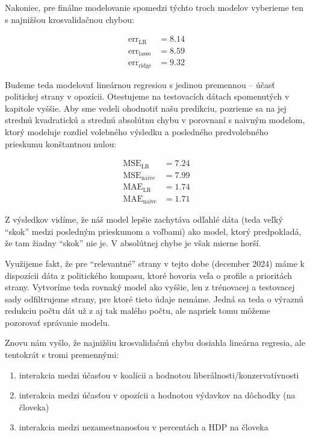 \documentclass[report.tex]{subfiles}
\begin{document}
Nakoniec, pre finálne modelovanie spomedzi týchto troch modelov vyberieme ten s najnižšou krosvalidačnou chybou:

\begin{align*}
	\operatorname{err}_{\operatorname{LR}} &= 8.14 \\
	\operatorname{err}_{\operatorname{lasso}} &= 8.59 \\
	\operatorname{err}_{\operatorname{ridge}} &= 9.32
\end{align*}

Budeme teda modelovať lineárnou regresiou s jedinou premennou -- účasť politickej strany v opozícii. Otestujeme na testovacích dátach spomenutých v kapitole vyššie. Aby sme vedeli ohodnotiť našu predikciu, pozrieme sa na jej strednú kvadratickú a strednú absolútnu chybu v porovnaní s naivným modelom, ktorý modeluje rozdiel volebného výsledku a posledného predvolebného prieskumu konštantnou nulou:

\begin{align*}
	\operatorname{MSE}_{\operatorname{LR}} &= 7.24 \\
	\operatorname{MSE}_{\operatorname{naive}} &= 7.99 \\
	\operatorname{MAE}_{\operatorname{LR}} &= 1.74 \\
	\operatorname{MAE}_{\operatorname{naive}} &= 1.71
\end{align*}

Z výsledkov vidíme, že náš model lepšie zachytáva odľahlé dáta (teda veľký \enquote{skok} medzi posledným prieskumom a voľbami) ako model, ktorý predpokladá, že tam žiadny \enquote{skok} nie je. V absolútnej chybe je však mierne horší.

Využijeme fakt, že pre \enquote{relevantné} strany v tejto dobe (december 2024) máme k dispozícii dáta z politického kompasu, ktoré hovoria veľa o profile a prioritách strany. Vytvoríme teda rovnaký model ako vyššie, len z trénovacej a testovacej sady odfiltrujeme strany, pre ktoré tieto údaje nemáme. Jedná sa teda o výraznú redukciu počtu dát už z aj tak malého počtu, ale napriek tomu môžeme pozorovať správanie modelu.

\newpage

Znovu nám vyšlo, že najnižšiu krosvalidačnú chybu dosiahla lineárna regresia, ale tentokrát s tromi premennými:

\begin{enumerate}
	\item interakcia medzi účasťou v koalícii a hodnotou liberálnosti/konzervatívnosti
	\item interakcia medzi účasťou v opozícii a hodnotou výdavkov na dôchodky (na človeka)
	\item interakcia medzi nezamestnanosťou v percentách a HDP na človeka
\end{enumerate}
\end{document}
